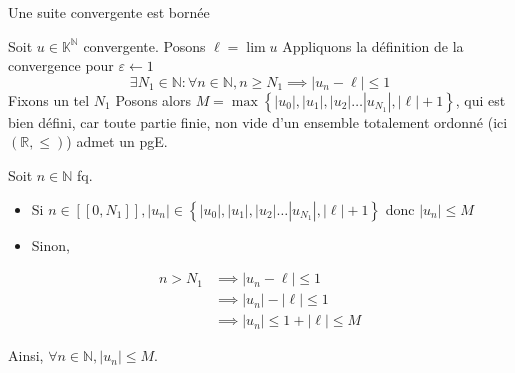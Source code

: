 \documentclass{article}
\begin{document}
\begin{question_kholle}{Une suite convergente est bornée}

	Soit $u \in \mathbb{K}^{\mathbb{N}}$ convergente.
	Posons $\ell = \lim u$
	Appliquons la définition de la convergence pour $\varepsilon \leftarrow 1$
	$$
		\exists N_{1}\in \mathbb{N}: \forall n \in \mathbb{N}, n \geqslant N_{1} \implies |u_{n}-\ell| \leqslant 1
	$$
	Fixons un tel $N_{1}$
	Posons alors $M = \max\left\{ |u_{0}|, |u_{1}|, |u_{2}| \dots |u_{N_{1}}|, |\ell|+1 \right\}$, qui est bien défini, car toute partie finie, non vide d'un ensemble totalement ordonné (ici $(\mathbb{R}, \leqslant)$) admet un pgE.

	Soit $n \in \mathbb{N}$ fq.
	\begin{itemize}
		\item Si $n \in [[0, N_{1}]], |u_{n}| \in \left\{ |u_{0}|, |u_{1}|, |u_{2}| \dots |u_{N_{1}}|, |\ell|+1 \right\}$ donc $|u_{n}| \leqslant M$
		\item Sinon,
	\end{itemize}

	\begin{align*}
		n> N_{1} & \implies |u_{n} - \ell| \leqslant 1              \\
		         & \implies |u_{n}| - |\ell| \leqslant 1            \\
		         & \implies |u_{n}| \leqslant 1+ |\ell| \leqslant M
	\end{align*}

	Ainsi, $\forall n \in \mathbb{N}, |u_{n}| \leqslant M$.
\end{question_kholle}
\end{document}
